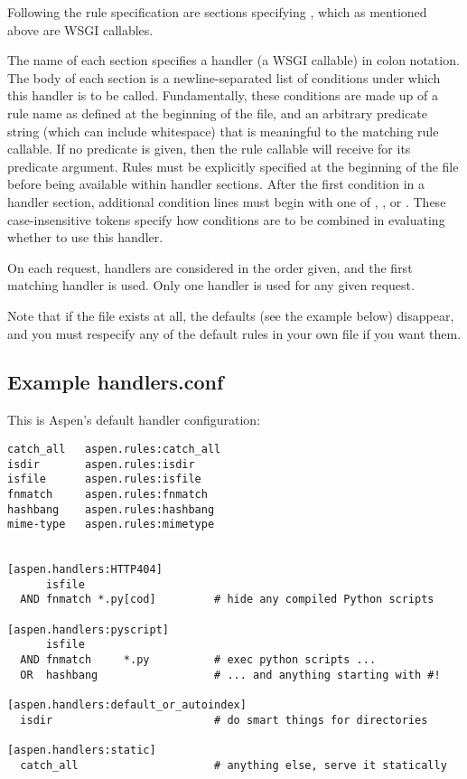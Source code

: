 Following the rule specification are sections specifying , which
as mentioned above are WSGI callables.

The name of each section specifies a handler (a WSGI callable) in colon
notation. The body of each section is a newline-separated list of conditions
under which this handler is to be called. Fundamentally, these conditions are
made up of a rule name as defined at the beginning of the file, and an arbitrary
predicate string (which can include whitespace) that is meaningful to the
matching rule callable. If no predicate is given, then the rule callable will
receive  for its predicate argument. Rules must be explicitly
specified at the beginning of the file before being available within handler
sections. After the first condition in a handler section, additional condition
lines must begin with one of , , or . These
case-insensitive tokens specify how conditions are to be combined in evaluating
whether to use this handler.

On each request, handlers are considered in the order given, and the first
matching handler is used. Only one handler is used for any given request.

Note that if the file  exists at all, the defaults
(see the example below) disappear, and you must respecify any of the default
rules in your own file if you want them.


\subsection{Example handlers.conf}
This is Aspen's default handler configuration:

\begin{verbatim}
catch_all   aspen.rules:catch_all
isdir       aspen.rules:isdir
isfile      aspen.rules:isfile
fnmatch     aspen.rules:fnmatch
hashbang    aspen.rules:hashbang
mime-type   aspen.rules:mimetype


[aspen.handlers:HTTP404]
      isfile
  AND fnmatch *.py[cod]         # hide any compiled Python scripts

[aspen.handlers:pyscript]
      isfile
  AND fnmatch     *.py          # exec python scripts ...
  OR  hashbang                  # ... and anything starting with #!

[aspen.handlers:default_or_autoindex]
  isdir                         # do smart things for directories

[aspen.handlers:static]
  catch_all                     # anything else, serve it statically
\end{verbatim}


